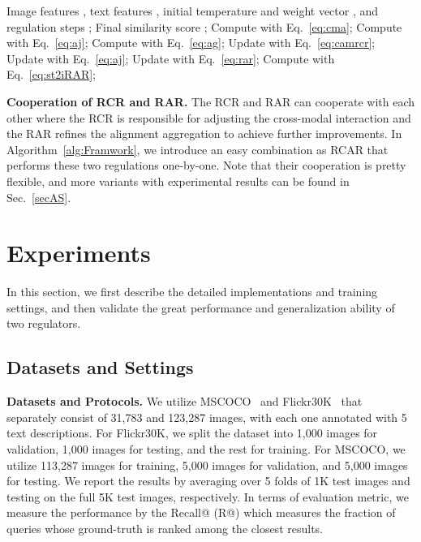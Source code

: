 \documentclass[journal]{IEEEtran}\newcommand{\ignore}[1]{}
\begin{document}
\begin{algorithm}[t!]
    \caption{Cooperation of RCR and RAR (RCAR)}
    \label{alg:Framwork}
    \begin{algorithmic}[1]
    \Require
        Image features , text features , initial temperature  and weight vector , and regulation steps ;
    \Ensure
        Final similarity score ; 
    \State Compute  with Eq.~\eqref{eq:cma};
    \State Compute  with Eq.~\eqref{eq:aj};
    \State Compute  with Eq.~\eqref{eq:ag};
    \State Update  with Eq.~\eqref{eq:camrcr};
    \State Update  with Eq.~\eqref{eq:aj};
    \State Update  with Eq.~\eqref{eq:rar};
    \EndFor
    \State Compute  with Eq.~\eqref{eq:st2iRAR};\\
    \Return 
    \end{algorithmic}
\end{algorithm}

{\bf Cooperation of RCR and RAR.}
\label{secRCAR}
The RCR and RAR can cooperate with each other where the RCR is responsible for adjusting the cross-modal interaction and the RAR refines the alignment aggregation to achieve further improvements. In Algorithm~\ref{alg:Framwork}, we introduce an easy combination as RCAR that performs these two regulations one-by-one. Note that their cooperation is pretty flexible, and more variants with experimental results can be found in Sec.~\ref{secAS}.

\section{Experiments}
In this section, we first describe the detailed implementations and training settings, and then validate the great performance and generalization ability of two regulators.

\subsection{Datasets and Settings}
\textbf{Datasets and Protocols.} We utilize MSCOCO~\cite{MSCOCO} and Flickr30K~\cite{Flickr30k} that separately consist of 31,783 and 123,287 images, with each one annotated with 5 text descriptions. 
For Flickr30K, we split the dataset into 1,000 images for validation, 1,000 images for testing, and the rest for training.
For MSCOCO, we utilize 113,287 images for training, 5,000 images for validation, and 5,000 images for testing. We report the results by averaging over 5 folds of 1K test images and testing on the full 5K test images, respectively. In terms of evaluation metric, we measure the performance by the Recall@ (R@) which measures the fraction of queries whose ground-truth is ranked among the closest  results.
\end{document}
